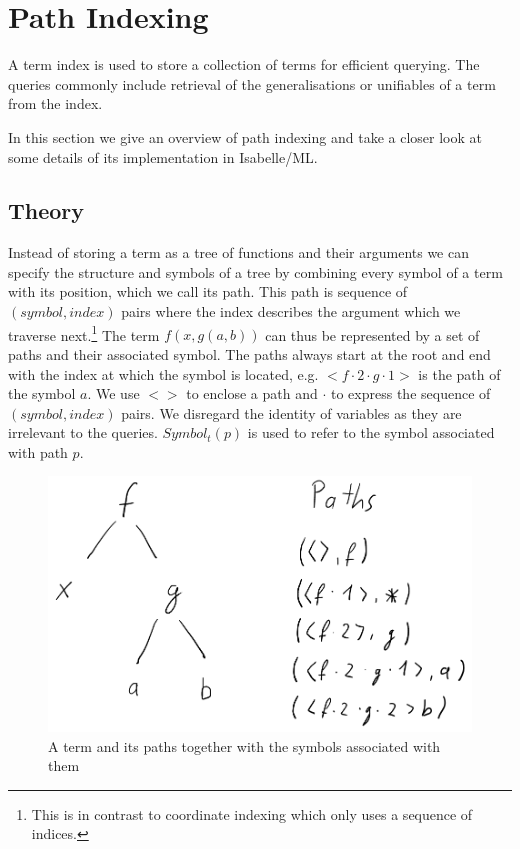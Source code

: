 \chapter{Path Indexing}
A term index is used to store a collection of terms for efficient querying. The queries commonly include retrieval of the generalisations or unifiables of a term from the index. 

In this section we give an overview of path indexing and take a closer look at some details of its implementation in Isabelle/ML.

\section{Theory}
Instead of storing a term as a tree of functions and their arguments we can specify the structure and symbols of a tree by combining every symbol of a term with its position, which we call its path. This path is sequence of $(symbol, index)$ pairs where the index describes the argument which we traverse next.\footnote{This is in contrast to coordinate indexing which only uses a sequence of indices.} The term $f(x,g(a,b))$ can thus be represented by a set of paths and their associated symbol.
The paths always start at the root and end with the index at which the symbol is located, e.g. $<f \cdot 2 \cdot g \cdot 1>$ is the path of the symbol $a$. We use $<>$ to enclose a path and $\cdot$ to express the sequence of $(symbol, index)$ pairs.  We disregard the identity of variables as they are irrelevant to the queries. $Symbol_{t}(p)$ is used to refer to the symbol associated with path $p$.

\begin{figure}[h]
\centering
\includegraphics[scale=0.25]{figures/term_path.png}
\caption{A term and its paths together with the symbols associated with them}
\end{figure}

